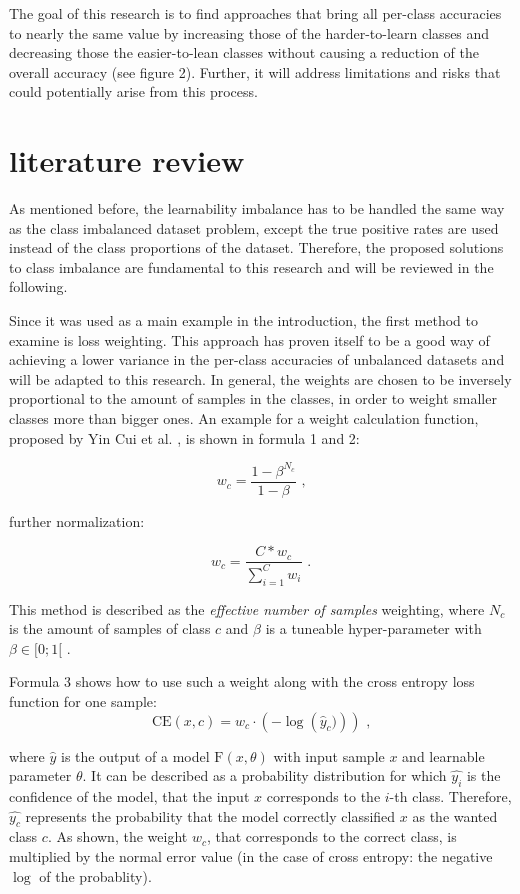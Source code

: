 \documentclass[journal]{IEEEtran}
\begin{document}
The goal of this research is to find approaches that bring all per-class accuracies to nearly the same value by increasing those of the harder-to-learn classes
and decreasing those the easier-to-lean classes without causing a reduction of the overall accuracy (see figure 2).
Further, it will address limitations and risks that could potentially arise from this process.

\section{literature review}
As mentioned before, the learnability imbalance has to be handled the same way as the class imbalanced dataset problem, except the true positive rates are used instead of the class proportions of the dataset.
Therefore, the proposed solutions to class imbalance are fundamental to this research and will be reviewed in the following.

Since it was used as a main example in the introduction, the first method to examine is loss weighting. 
This approach has proven itself to be a good way of achieving a lower variance in the per-class accuracies of unbalanced datasets and will be adapted to this research. 
In general, the weights are chosen to be inversely proportional to the amount of samples in the classes, in order to weight smaller classes more than bigger ones. 
An example for a weight calculation function, proposed by Yin Cui et al. \cite{cui2019class}, is shown in formula 1 and 2:

\[ w_c = \frac{1-\beta^{N_c}}{1-\beta} \text{ ,} \tag{1} \]

further normalization:

\[ w_c = \frac{C * w_c}{\sum_{i=1}^{C}w_i} \text{ .} \tag{2} \]

This method is described as the \emph{effective number of samples} weighting, where $N_c$ is the amount of samples of class $c$ and $\beta$ is a tuneable hyper-parameter with $\beta \in [0;1[$ .

Formula 3 shows how to use such a weight along with the cross entropy loss function for one sample:
\[ \text{CE}(x, c) = w_{c} \cdot \left(-\log\left(\hat{y}_c)\right) \right) \text{ ,} \tag{3} \]

where $\hat{y}$ is the output of a model $\text{F}(x, \theta)$ with input sample $x$ and learnable parameter $\theta$. 
It can be described as a probability distribution for which $\hat{y_i}$ is the confidence of the model, that the input $x$ corresponds to the $i$-th class.
Therefore, $\hat{y_c}$ represents the probability that the model correctly classified $x$ as the wanted class $c$. 
As shown, the weight $w_c$, that corresponds to the correct class, is multiplied by the normal error value (in the case of cross entropy: the negative $\log$ of the probablity).
\end{document}
